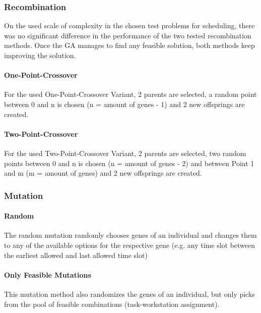 \documentclass[a4paper,12pt,twoside]{scrreprt}
\begin{document}
\begin{flushleft}
\subsubsection{Recombination}
On the used scale of complexity in the chosen test problems for scheduling, there was no significant difference in the performance of the two tested recombination methods. Once the GA manages to find any feasible solution, both methods keep improving the solution.

\paragraph{One-Point-Crossover}
For the used One-Point-Crossover Variant, 2 parents are selected, a random point between 0 and n is chosen (n = amount of genes - 1) and 2 new offsprings are created.

\paragraph{Two-Point-Crossover}
For the used Two-Point-Crossover Variant, 2 parents are selected, two random points between 0 and n is chosen (n = amount of genes - 2) and between Point 1 and m (m = amount of genes) and 2 new offsprings are created.

\subsubsection{Mutation}

\paragraph{Random}
The random mutation randomly chooses genes of an individual and changes them to any of the available options for the respective gene (e.g. any time slot between the earliest allowed and last allowed time slot)

\paragraph{Only Feasible Mutations}
This mutation method also randomizes the genes of an individual, but only picks from the pool of feasible combinations (task-workstation assignment).


\end{flushleft}
\end{document}
